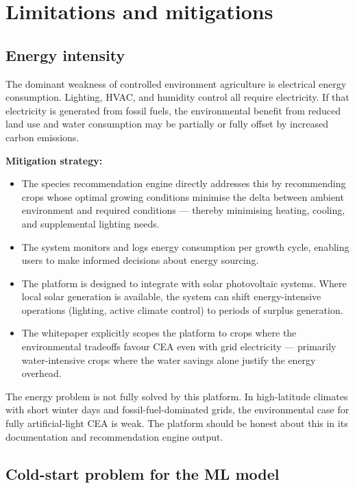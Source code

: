 \section{Limitations and mitigations}\label{sec:limitations}

\subsection{Energy intensity}

The dominant weakness of controlled environment agriculture is electrical energy consumption. Lighting, HVAC, and humidity control all require electricity. If that electricity is generated from fossil fuels, the environmental benefit from reduced land use and water consumption may be partially or fully offset by increased carbon emissions.

\textbf{Mitigation strategy:}

\begin{itemize}
  \item The species recommendation engine directly addresses this by recommending crops whose optimal growing conditions minimise the delta between ambient environment and required conditions --- thereby minimising heating, cooling, and supplemental lighting needs.
  \item The system monitors and logs energy consumption per growth cycle, enabling users to make informed decisions about energy sourcing.
  \item The platform is designed to integrate with solar photovoltaic systems. Where local solar generation is available, the system can shift energy-intensive operations (lighting, active climate control) to periods of surplus generation.
  \item The whitepaper explicitly scopes the platform to crops where the environmental tradeoffs favour CEA even with grid electricity --- primarily water-intensive crops where the water savings alone justify the energy overhead.
\end{itemize}

The energy problem is not fully solved by this platform. In high-latitude climates with short winter days and fossil-fuel-dominated grids, the environmental case for fully artificial-light CEA is weak. The platform should be honest about this in its documentation and recommendation engine output.

\subsection{Cold-start problem for the ML model}

